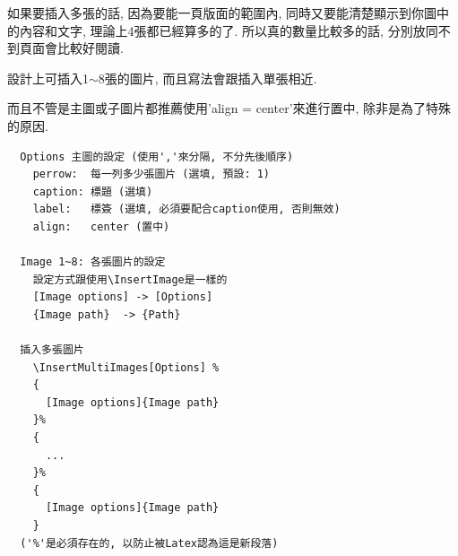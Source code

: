 \newpage
{}

  如果要插入多張的話, 因為要能一頁版面的範圍內, 同時又要能清楚顯示到你圖中的內容和文字, 理論上4張都已經算多的了. 所以真的數量比較多的話, 分別放同不到頁面會比較好閱讀.

  設計上可插入1$\sim$8張的圖片, 而且寫法會跟插入單張相近.

  而且不管是主圖或子圖片都推薦使用'align = center'來進行置中, 除非是為了特殊的原因.

  \begin{framed}
  \begin{verbatim}
  Options 主圖的設定 (使用','來分隔, 不分先後順序)
    perrow:  每一列多少張圖片 (選填, 預設: 1)
    caption: 標題 (選填)
    label:   標簽 (選填, 必須要配合caption使用, 否則無效)
    align:   center (置中)

  Image 1~8: 各張圖片的設定
    設定方式跟使用\InsertImage是一樣的
    [Image options] -> [Options]
    {Image path}  -> {Path}

  插入多張圖片
    \InsertMultiImages[Options] %
    {
      [Image options]{Image path}
    }%
    {
      ...
    }%
    {
      [Image options]{Image path}
    }
  ('%'是必須存在的, 以防止被Latex認為這是新段落)
  \end{verbatim}
  \end{framed}

  \newpage

